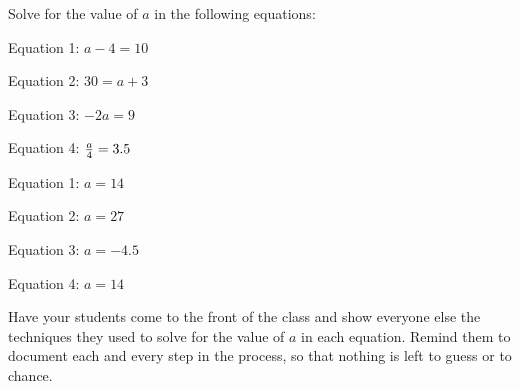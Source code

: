 

Solve for the value of $a$ in the following equations:

\vskip 10pt

Equation 1: $a - 4 = 10$

\vskip 5pt

Equation 2: $30 = a + 3$

\vskip 5pt

Equation 3: $-2a = 9$

\vskip 5pt

Equation 4: ${a \over 4} = 3.5$

\vskip 10pt







Equation 1: $a = 14$

\vskip 5pt

Equation 2: $a = 27$

\vskip 5pt

Equation 3: $a = -4.5$

\vskip 5pt

Equation 4: $a = 14$







Have your students come to the front of the class and show everyone else the techniques they used to solve for the value of $a$ in each equation.  Remind them to document each and every step in the process, so that nothing is left to guess or to chance.




